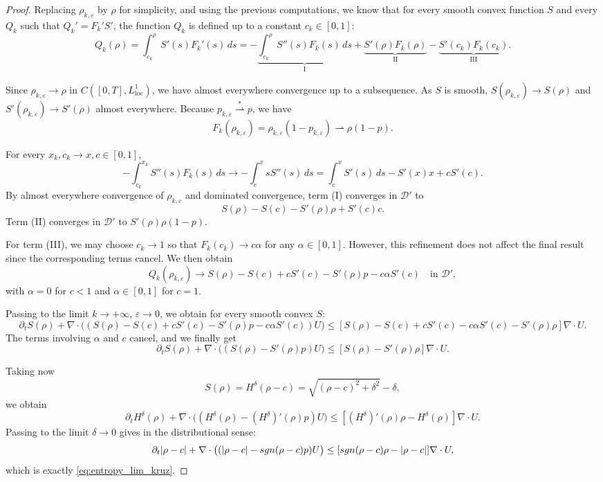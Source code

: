 \documentclass[10pt,a4paper]{amsart}
\newcommand {\eps}  {\varepsilon}
\newcommand {\sgn} { {\rm sgn} }
\begin{document}
\begin{proof}
Replacing $\rho_{k,\eps}$ by $\rho$ for simplicity, and using the previous computations, we know that for every smooth convex function $S$ and every $Q_k$ such that $Q_k' = F_k' S'$, the function $Q_k$ is defined up to a constant $c_k\in[0,1]$:
\[
Q_k(\rho)
= \int_{c_k}^{\rho} S'(s)F_k'(s)\,ds
= -\underbrace{\int_{c_k}^{\rho} S''(s)F_k(s)\,ds}_{\mathrm{I}}
+\underbrace{S'(\rho)F_k(\rho)}_{\mathrm{II}}
-\underbrace{S'(c_k)F_k(c_k)}_{\mathrm{III}}.
\]

Since $\rho_{k,\eps}\to\rho$ in $C([0,T],L^1_{\mathrm{loc}})$, we have almost everywhere convergence up to a subsequence.  
As $S$ is smooth, $S(\rho_{k,\eps})\to S(\rho)$ and $S'(\rho_{k,\eps})\to S'(\rho)$ almost everywhere.  
Because $p_{k,\eps}\overset{*}{\rightharpoonup}p$, we have
\[
F_k(\rho_{k,\eps})
=\rho_{k,\eps}(1-p_{k,\eps})
\rightharpoonup \rho(1-p).
\]

For every $x_k,c_k\to x,c\in[0,1]$,
\[
-\int_{c_k}^{x_k} S''(s)F_k(s)\,ds
\longrightarrow
-\int_c^x sS''(s)\,ds
= \int_c^x S'(s)\,ds - S'(x)x + cS'(c).
\]
By almost everywhere convergence of $\rho_{k,\eps}$ and dominated convergence, term (I) converges in $\mathcal{D}'$ to
\[
S(\rho)-S(c)-S'(\rho)\rho + S'(c)c.
\]
Term (II) converges in $\mathcal{D}'$ to $S'(\rho)\rho(1-p)$.

For term (III), we may choose $c_k\to 1$ so that $F_k(c_k)\to c\alpha$ for any $\alpha\in[0,1]$. However, this refinement does not affect the final result since the corresponding terms cancel. We then obtain
\[
Q_k(\rho_{k,\eps})
\to
S(\rho)-S(c)+cS'(c)-S'(\rho)p-c\alpha S'(c)
\quad\text{in }\mathcal{D}',
\]
with $\alpha=0$ for $c<1$ and $\alpha\in[0,1]$ for $c=1$.

Passing to the limit $k\to+\infty$, $\eps\to0$, we obtain for every smooth convex $S$:
\[
\partial_t S(\rho)
+\nabla\cdot\big((S(\rho)-S(c)+cS'(c)-S'(\rho)p-c\alpha S'(c))U\big)
\le
[S(\rho)-S(c)+cS'(c)-c\alpha S'(c)-S'(\rho)\rho]\nabla\cdot U.
\]
The terms involving $\alpha$ and $c$ cancel, and we finally get
\begin{equation}
\partial_t S(\rho)
+\nabla\cdot\big((S(\rho)-S'(\rho)p)U\big)
\le
[S(\rho)-S'(\rho)\rho]\nabla\cdot U.
\end{equation}

Taking now
\[
S(\rho)=H^\delta(\rho-c)
=\sqrt{(\rho-c)^2+\delta^2}-\delta,
\]
we obtain
\[
\partial_t H^\delta(\rho)
+\nabla\cdot\big((H^\delta(\rho)-(H^\delta)'(\rho)p)U\big)
\le
[(H^\delta)'(\rho)\rho-H^\delta(\rho)]\nabla\cdot U.
\]
Passing to the limit $\delta\to0$ gives in the distributional sense:
\[
\partial_t |\rho-c|
+\nabla\cdot\big((|\rho-c|-\sgn(\rho-c)p)U\big)
\le
[\sgn(\rho-c)\rho-|\rho-c|]\nabla\cdot U,
\]
which is exactly \eqref{eq:entropy_lim_kruz}.
\end{proof}
\end{document}
